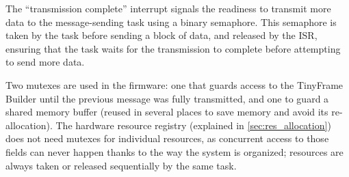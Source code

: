 The ``transmission complete'' interrupt signals the readiness to transmit more data to the message-sending task using a binary semaphore. This semaphore is taken by the task before sending a block of data, and released by the \gls{ISR}, ensuring that the task waits for the transmission to complete before attempting to send more data.

Two mutexes are used in the firmware: one that guards access to the TinyFrame Builder until the previous message was fully transmitted, and one to guard a shared memory buffer (reused in several places to save memory and avoid its re-allocation). The hardware resource registry (explained in \cref{sec:res_allocation}) does not need mutexes for individual resources, as concurrent access to those fields can never happen thanks to the way the system is organized; resources are always taken or released sequentially by the same task.
